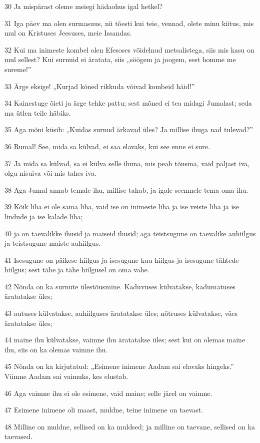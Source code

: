 \par 30 Ja mispärast oleme meiegi hädaohus igal hetkel?
\par 31 Iga päev ma olen surmasuus, nii tõesti kui teie, vennad, olete minu kiitus, mis mul on Kristuses Jeesuses, meie Issandas.
\par 32 Kui ma inimeste kombel olen Efesoses võidelnud metsalistega, siis mis kasu on mul sellest? Kui surnuid ei äratata, siis „söögem ja joogem, sest homme me sureme!”
\par 33 Ärge eksige! „Kurjad kõned rikkuda võivad kombeid häid!”
\par 34 Kainestuge õieti ja ärge tehke pattu; sest mõned ei tea midagi Jumalast; seda ma ütlen teile häbiks.
\par 35 Aga mõni küsib: „Kuidas surnud ärkavad üles? Ja millise ihuga nad tulevad?”
\par 36 Rumal! See, mida sa külvad, ei saa elavaks, kui see enne ei sure.
\par 37 Ja mida sa külvad, sa ei külva selle ihuna, mis peab tõusma, vaid paljast iva, olgu nisuiva või mis tahes iva.
\par 38 Aga Jumal annab temale ihu, millise tahab, ja igale seemnele tema oma ihu.
\par 39 Kõik liha ei ole sama liha, vaid ise on inimeste liha ja ise veiste liha ja ise lindude ja ise kalade liha;
\par 40 ja on taevalikke ihusid ja maiseid ihusid; aga teistsugune on taevalike auhiilgus ja teistsugune maiste auhiilgus.
\par 41 Isesugune on päikese hiilgus ja isesugune kuu hiilgus ja isesugune tähtede hiilgus; sest tähe ja tähe hiilgusel on oma vahe.
\par 42 Nõnda on ka surnute ülestõusmine. Kaduvuses külvatakse, kadumatuses äratatakse üles;
\par 43 autuses külvatakse, auhiilguses äratatakse üles; nõtruses külvatakse, väes äratatakse üles;
\par 44 maine ihu külvatakse, vaimne ihu äratatakse üles; sest kui on olemas maine ihu, siis on ka olemas vaimne ihu.
\par 45 Nõnda on ka kirjutatud: „Esimene inimene Aadam sai elavaks hingeks.” Viimne Aadam sai vaimuks, kes elustab.
\par 46 Aga vaimne ihu ei ole esimene, vaid maine; selle järel on vaimne.
\par 47 Esimene inimene oli maast, muldne, teine inimene on taevast.
\par 48 Milline on muldne, sellised on ka muldsed; ja milline on taevane, sellised on ka taevased.
